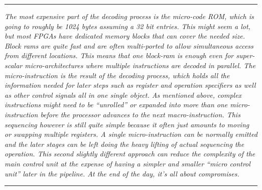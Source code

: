         \par\noindent\rule{\textwidth}{0.4pt}
        \textit{The most expensive part of the decoding process is the micro-code ROM, which is going to roughly be 1024 bytes assuming a 32 bit entries. This might seem a lot, but most FPGAs have dedicated memory blocks that can cover the needed size. Block rams are quite fast and are often multi-ported to allow simultaneous access from different locations. This means that one block-ram is enough even for super-scalar micro-architectures where multiple instructions are decoded in parallel. The micro-instruction is the result of the decoding process, which holds all the information needed for later steps such as register and operation specifiers as well as other control signals all in one single object. As mentioned above, complex instructions might need to be ``unrolled'' or expanded into more than one micro-instruction before the processor advances to the next macro-instruction. This sequencing however is still quite simple because it often just amounts to moving or swapping multiple registers. A single micro-instruction can be normally emitted and the later stages can be left doing the heavy lifting of actual sequencing the operation. This second slightly different approach can reduce the complexity of the main control unit at the expense of having a simpler and smaller ``micro control unit'' later in the pipeline. At the end of the day, it's all about compromises.}
        \par\noindent\rule{\textwidth}{0.4pt}